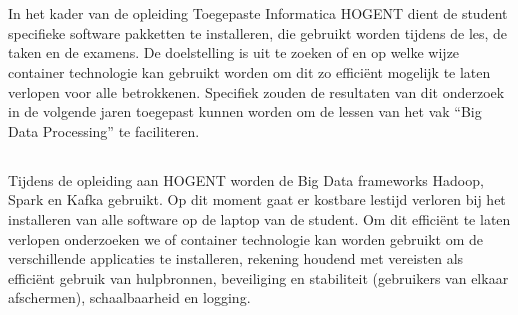 
\chapter{}%
\label{ch:inleiding}

In het kader van de opleiding Toegepaste Informatica HOGENT dient de student specifieke software pakketten te installeren, die gebruikt worden tijdens de les, de taken en de examens.
De doelstelling is uit te zoeken of en op welke wijze container technologie kan gebruikt worden om dit zo efficiënt mogelijk te laten verlopen voor alle betrokkenen. Specifiek zouden de resultaten van dit onderzoek in de volgende jaren toegepast kunnen worden om de lessen van het vak ``Big Data Processing'' te faciliteren.

\section{}%
\label{sec:probleemstelling}
Tijdens de opleiding aan HOGENT worden de Big Data frameworks Hadoop, Spark en Kafka gebruikt. Op dit moment gaat er kostbare lestijd verloren bij het installeren van alle software op de laptop van de student. Om dit efficiënt te laten verlopen onderzoeken we of container technologie kan worden gebruikt om de verschillende applicaties te installeren, rekening houdend met vereisten als efficiënt gebruik van hulpbronnen, beveiliging en stabiliteit (gebruikers van elkaar afschermen), schaalbaarheid en logging.

